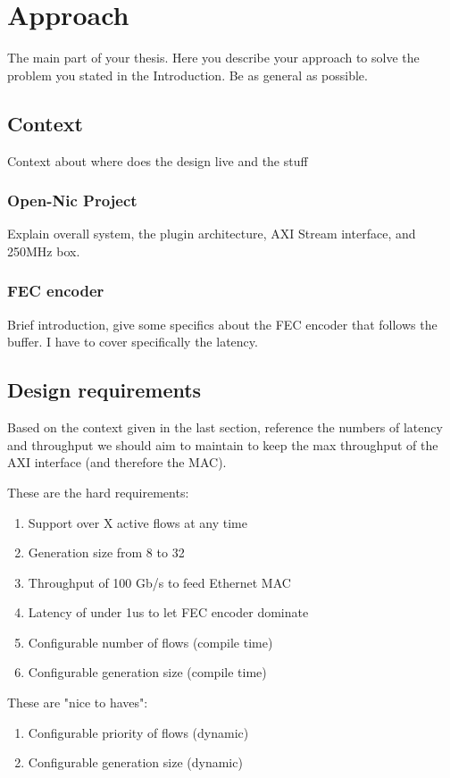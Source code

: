 \chapter{Approach}
The main part of your thesis. Here you describe your approach to solve
the problem you stated in the Introduction.  Be as general as possible.

\section{Context} %
Context about where does the design live and the stuff 

\subsection{Open-Nic Project}
Explain overall system, the plugin architecture, AXI Stream interface, and 250MHz box.

\subsection{FEC encoder}
Brief introduction, give some specifics about the FEC encoder that follows the buffer.
I have to cover specifically the latency.

\section{Design requirements}
Based on the context given in the last section, reference the numbers of latency and throughput we should 
aim to maintain to keep the max throughput of the AXI interface (and therefore the MAC).

These are the hard requirements:
\begin{enumerate}
  \item Support over X active flows at any time
  \item Generation size from 8 to 32
  \item Throughput of 100 Gb/s to feed Ethernet MAC
  \item Latency of under 1us to let FEC encoder dominate
  \item Configurable number of flows (compile time)
  \item Configurable generation size (compile time)
\end{enumerate}

These are "nice to haves":
\begin{enumerate}
  \item Configurable priority of flows (dynamic)
  \item Configurable generation size (dynamic)
\end{enumerate}

